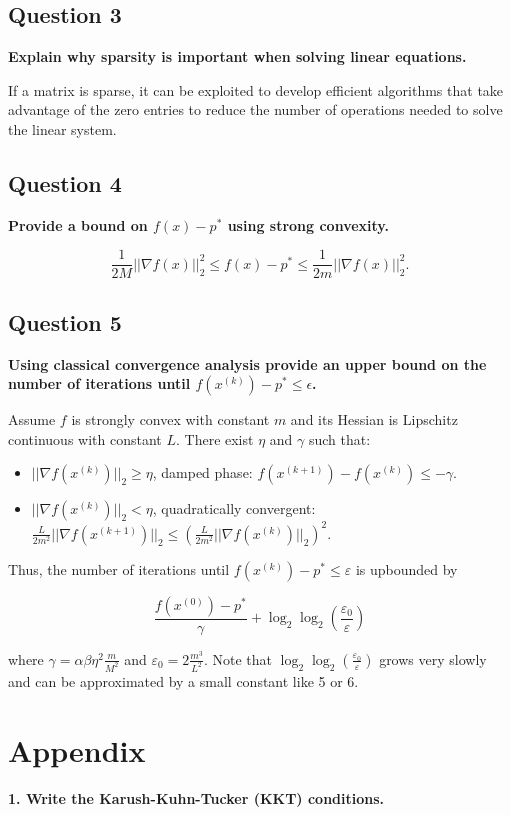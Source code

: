 \subsection*{Question 3}
\textbf{Explain why sparsity is important when solving linear equations.}

If a matrix is sparse, it can be exploited to develop efficient algorithms that take advantage of the zero entries to reduce the number of operations needed to solve the linear system.

\subsection*{Question 4}
\textbf{Provide a bound on $f (x) - p^*$ using strong convexity.}

$$ \frac{1}{2M}||\nabla f(x)||^2_2 \leq  f(x) - p^*  \leq \frac{1}{2m}||\nabla f(x)||^2_2. $$

\subsection*{Question 5}
\textbf{Using classical convergence analysis provide an upper bound on the number of iterations until $f (x^{(k)}) - p^* \leq \epsilon$.}

Assume $f$ is strongly convex with constant $m$ and its Hessian is Lipschitz continuous with constant $L$. There exist $\eta$ and $\gamma$ such that:

\begin{itemize}
    \item $||\nabla f(x^{(k)})||_2 \ge \eta$, damped phase: $f(x^{(k+1)}) - f(x^{(k)}) \le -\gamma$.
    \item $||\nabla f(x^{(k)})||_2 < \eta$, quadratically convergent: $ \frac{L}{2m^2}||\nabla f(x^{(k+1)})||_2 \le \left( \frac{L}{2m^2}||\nabla f(x^{(k)})||_2 \right)^2$. 
\end{itemize}

Thus, the number of iterations until $f(x^{(k)})-p^*\le \varepsilon$ is upbounded by

$$
\frac{f(x^{(0)})-p^*}{\gamma} + \log_2 \log_2 \left(\frac{\varepsilon_0}{\varepsilon}\right)
$$

where $\gamma = \alpha\beta \eta^2 \frac{m}{M^2}$ and $\varepsilon_0 = 2\frac{m^3}{L^2}$. Note that $\log_2 \log_2 \left(\frac{\varepsilon_0}{\varepsilon}\right)$ grows very slowly and can be approximated by a small constant like 5 or 6.


\section*{Appendix}
\noindent\textbf{1. \; Write the Karush-Kuhn-Tucker (KKT) conditions.}

